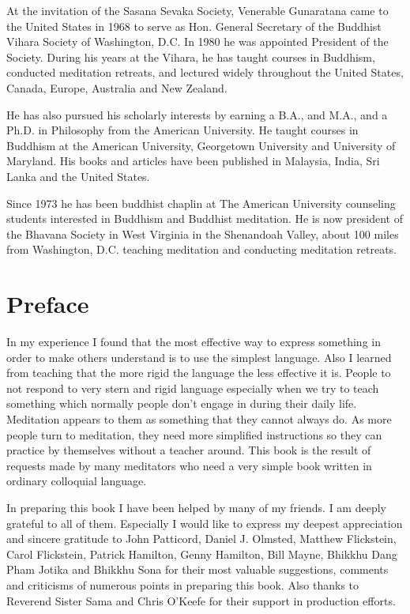 At the invitation of the Sasana Sevaka Society, Venerable Gunaratana came to the
United States in 1968 to serve as Hon. General Secretary of the Buddhist Vihara
Society of Washington, D.C. In 1980 he was appointed President of the Society.
During his years at the Vihara, he has taught courses in Buddhism, conducted
meditation retreats, and lectured widely throughout the United States, Canada,
Europe, Australia and New Zealand.

He has also pursued his scholarly interests by earning a B.A., and M.A., and a
Ph.D. in Philosophy from the American University. He taught courses in Buddhism
at the American University, Georgetown University and University of Maryland.
His books and articles have been published in Malaysia, India, Sri Lanka and the
United States.

Since 1973 he has been buddhist chaplin at The American University counseling
students interested in Buddhism and Buddhist meditation. He is now president of
the Bhavana Society in West Virginia in the Shenandoah Valley, about 100 miles
from Washington, D.C. teaching meditation and conducting meditation retreats.

\newpage
\section*{Preface}

In my experience I found that the most effective way to express something in order to make others understand is to use the
simplest language. Also I learned from teaching that the more rigid the language the less effective it is. People to not respond to
very stern and rigid language especially when we try to teach something which normally people don't engage in during their daily
life. Meditation appears to them as something that they cannot always do. As more people turn to meditation, they need more
simplified instructions so they can practice by themselves without a teacher around. This book is the result of requests made by
many meditators who need a very simple book written in ordinary colloquial language.

In preparing this book I have been helped by many of my friends. I am deeply grateful to all of them. Especially I would like to
express my deepest appreciation and sincere gratitude to John Patticord, Daniel J. Olmsted, Matthew Flickstein, Carol Flickstein,
Patrick Hamilton, Genny Hamilton, Bill Mayne, Bhikkhu Dang Pham Jotika and Bhikkhu Sona for their most valuable
suggestions, comments and criticisms of numerous points in preparing this book. Also thanks to Reverend Sister Sama and Chris
O'Keefe for their support in production efforts.

\maketitle

\newpage